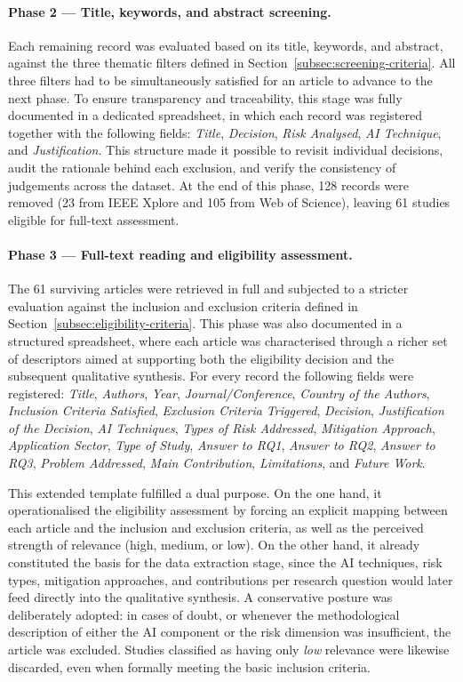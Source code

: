 \paragraph{Phase 2 --- Title, keywords, and abstract screening.}
Each remaining record was evaluated based on its title, keywords, and abstract, against the three thematic filters defined in Section~\ref{subsec:screening-criteria}. All three filters had to be simultaneously satisfied for an article to advance to the next phase. To ensure transparency and traceability, this stage was fully documented in a dedicated spreadsheet, in which each record was registered together with the following fields: \textit{Title}, \textit{Decision}, \textit{Risk Analysed}, \textit{AI Technique}, and \textit{Justification}. This structure made it possible to revisit individual decisions, audit the rationale behind each exclusion, and verify the consistency of judgements across the dataset. At the end of this phase, 128 records were removed (23 from IEEE Xplore and 105 from Web of Science), leaving 61 studies eligible for full-text assessment.

\paragraph{Phase 3 --- Full-text reading and eligibility assessment.}
The 61 surviving articles were retrieved in full and subjected to a stricter evaluation against the inclusion and exclusion criteria defined in Section~\ref{subsec:eligibility-criteria}. This phase was also documented in a structured spreadsheet, where each article was characterised through a richer set of descriptors aimed at supporting both the eligibility decision and the subsequent qualitative synthesis. For every record the following fields were registered: \textit{Title}, \textit{Authors}, \textit{Year}, \textit{Journal/Conference}, \textit{Country of the Authors}, \textit{Inclusion Criteria Satisfied}, \textit{Exclusion Criteria Triggered}, \textit{Decision}, \textit{Justification of the Decision}, \textit{AI Techniques}, \textit{Types of Risk Addressed}, \textit{Mitigation Approach}, \textit{Application Sector}, \textit{Type of Study}, \textit{Answer to RQ1}, \textit{Answer to RQ2}, \textit{Answer to RQ3}, \textit{Problem Addressed}, \textit{Main Contribution}, \textit{Limitations}, and \textit{Future Work}.

This extended template fulfilled a dual purpose. On the one hand, it operationalised the eligibility assessment by forcing an explicit mapping between each article and the inclusion and exclusion criteria, as well as the perceived strength of relevance (high, medium, or low). On the other hand, it already constituted the basis for the data extraction stage, since the AI techniques, risk types, mitigation approaches, and contributions per research question would later feed directly into the qualitative synthesis. A conservative posture was deliberately adopted: in cases of doubt, or whenever the methodological description of either the AI component or the risk dimension was insufficient, the article was excluded. Studies classified as having only \textit{low} relevance were likewise discarded, even when formally meeting the basic inclusion criteria.

